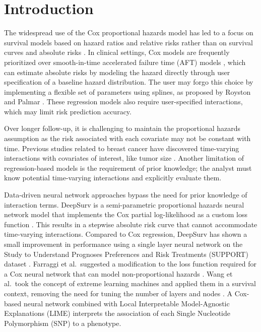 \documentclass[AMA,STIX1COL,]{WileyNJD-v2}
\begin{document}
\maketitle

\hypertarget{introduction}{%
\section{Introduction}\label{introduction}}

The widespread use of the Cox proportional hazards model has led to a
focus on survival models based on hazard ratios and relative risks
rather than on survival curves and absolute risks \citep{hanley2009}. In
clinical settings, Cox models are frequently prioritized over
smooth-in-time accelerated failure time (AFT) models \citep{hanley2009},
which can estimate absolute risks by modeling the hazard directly
through user specification of a baseline hazard distribution. The user
may forgo this choice by implementing a flexible set of parameters using
splines, as proposed by Royston and Palmar \citep{royston2002flexible}.
These regression models also require user-specified interactions, which
may limit risk prediction accuracy.

Over longer follow-up, it is challenging to maintain the proportional
hazards assumption as the risk associated with each covariate may not be
constant with time. Previous studies related to breast cancer have
discovered time-varying interactions with covariates of interest, like
tumor size \citep{coradini2000time} \citep{hilsenbeck1998time}. Another
limitation of regression-based models is the requirement of prior
knowledge; the analyst must know potential time-varying interactions and
explicitly evaluate them.

Data-driven neural network approaches bypass the need for prior
knowledge of interaction terms. DeepSurv is a semi-parametric
proportional hazards neural network model that implements the Cox
partial log-likelihood as a custom loss function
\citep{katzman2018DeepSurv}. This results in a stepwise absolute risk
curve that cannot accommodate time-varying interactions. Compared to Cox
regression, DeepSurv has shown a small improvement in performance using
a single layer neural network on the Study to Understand Prognoses
Preferences and Risk Treatments (SUPPORT) dataset
\citep{knaus1995SUPPORT}. Farraggi et al.~suggested a modification to
the loss function required for a Cox neural network that can model
non-proportional hazards \citep{faraggi1995neural}. Wang et al.~took the
concept of extreme learning machines and applied them in a survival
context, removing the need for tuning the number of layers and nodes
\citep{wang2019extreme}. A Cox-based neural network combined with Local
Interpretable Model-Agnostic Explanations (LIME)
\citep{ribeiro2016model} interprets the association of each Single
Nucleotide Polymorphism (SNP) \citep{sun2020genome} to a phenotype.
\end{document}
